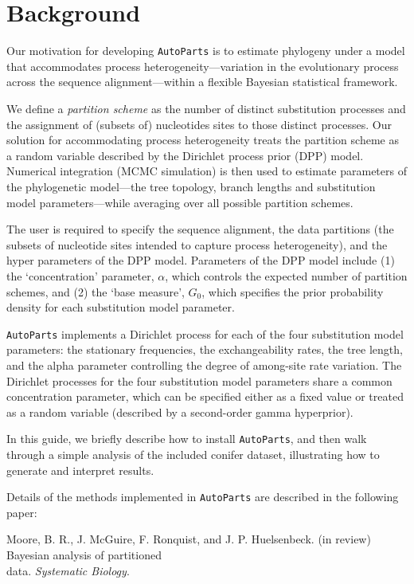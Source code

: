 \documentclass[11pt]{article}
\begin{document}
\newpage
\section*{Background}
\noindent
Our motivation for developing \verb!AutoParts! is to estimate phylogeny under a model that accommodates process heterogeneity---variation in the evolutionary process across the sequence alignment---within a flexible Bayesian statistical framework. 

We define a \emph{partition scheme} as the number of distinct substitution processes and the assignment of (subsets of) nucleotides sites to those distinct processes.
Our solution for accommodating process heterogeneity treats the partition scheme as a random variable described by the Dirichlet process prior (DPP) model.
Numerical integration (MCMC simulation) is then used to estimate parameters of the phylogenetic model---the tree topology, branch lengths and substitution model parameters---while averaging over all possible partition schemes.

The user is required to specify the sequence alignment, the data partitions (the subsets of nucleotide sites intended to capture process heterogeneity), and the hyper parameters of the DPP model. 
Parameters of the DPP model include (1) the `concentration' parameter, $\alpha$, which controls the expected number of partition schemes, and (2) the `base measure', $G_0$, which specifies the prior probability density for each substitution model parameter. 

\verb!AutoParts! implements a Dirichlet process for each of the four substitution model parameters: the stationary frequencies, the exchangeability rates, the tree length, and the alpha parameter controlling the degree of among-site rate variation. 
The Dirichlet processes for the four substitution model parameters share a common concentration parameter, which can be specified either as a fixed value or treated as a random variable (described by a second-order gamma hyperprior).

In this guide, we briefly describe how to install \verb!AutoParts!, and then walk through a simple analysis of the included conifer dataset, illustrating how to generate and interpret results.

Details of the methods implemented in \verb!AutoParts! are described in the following paper: \\ \vspace{-7mm}

\hangindent=1cm Moore, B. R., J. McGuire, F. Ronquist, and J. P. Huelsenbeck. (in review) Bayesian analysis of partitioned\\
data. \emph{Systematic Biology}.
\end{document}
